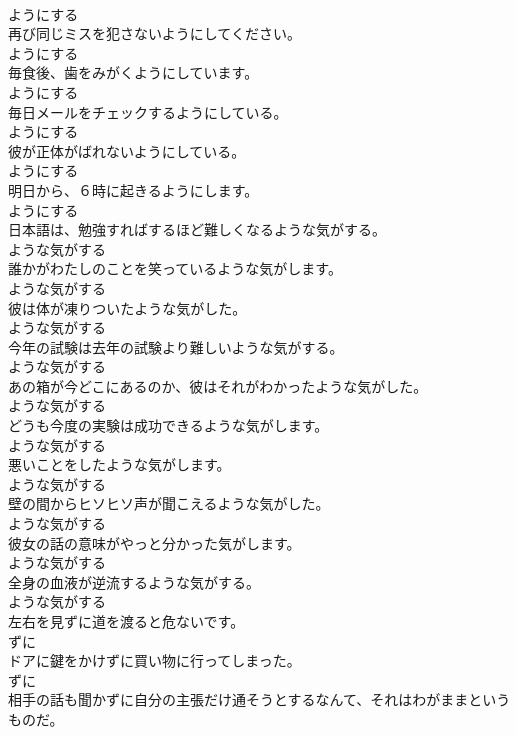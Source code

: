 \documentclass[8pt]{extreport}
\begin{document}
\begin{CJK}{UTF8}{min}
\\	ようにする
\\	再び同じミスを犯さないようにしてください。	
\\	ようにする
\\	毎食後、歯をみがくようにしています。	
\\	ようにする
\\	毎日メールをチェックするようにしている。	
\\	ようにする
\\	彼が正体がばれないようにしている。	
\\	ようにする
\\	明日から、６時に起きるようにします。	
\\	ようにする
\\	日本語は、勉強すればするほど難しくなるような気がする。	
\\	ような気がする
\\	誰かがわたしのことを笑っているような気がします。	
\\	ような気がする
\\	彼は体が凍りついたような気がした。	
\\	ような気がする
\\	今年の試験は去年の試験より難しいような気がする。	
\\	ような気がする
\\	あの箱が今どこにあるのか、彼はそれがわかったような気がした。	
\\	ような気がする
\\	どうも今度の実験は成功できるような気がします。	
\\	ような気がする
\\	悪いことをしたような気がします。	
\\	ような気がする
\\	壁の間からヒソヒソ声が聞こえるような気がした。	
\\	ような気がする
\\	彼女の話の意味がやっと分かった気がします。	
\\	ような気がする
\\	全身の血液が逆流するような気がする。	
\\	ような気がする
\\	左右を見ずに道を渡ると危ないです。	
\\	ずに
\\	ドアに鍵をかけずに買い物に行ってしまった。	
\\	ずに
\\	相手の話も聞かずに自分の主張だけ通そうとするなんて、それはわがままというものだ。	

\end{CJK}
\end{document}
